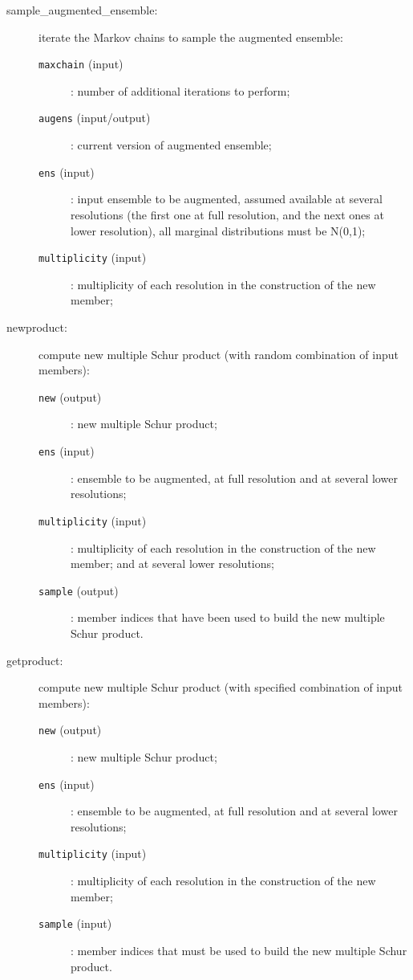 \documentclass[11pt]{article}
\begin{document}
\begin{description}
\item[sample\_augmented\_ensemble:] iterate the Markov chains to sample the augmented ensemble:
  \begin{description}
  \item[{\tt maxchain} (input)]: number of additional iterations to perform;
  \item[{\tt augens} (input/output)]: current version of augmented ensemble;
  \item[{\tt ens} (input)]: input ensemble to be augmented,
                            assumed available at several resolutions
                            (the first one at full resolution, and the next ones at lower resolution),
                            all marginal distributions must be N(0,1);
  \item[{\tt multiplicity} (input)]:  multiplicity of each resolution
                            in the construction of the new member;
  \end{description}
\item[newproduct:] compute new multiple Schur product (with random combination of input members):
  \begin{description}
  \item[{\tt new} (output)]: new multiple Schur product;
  \item[{\tt ens} (input)]: ensemble to be augmented, at full resolution
                            and at several lower resolutions;
  \item[{\tt multiplicity} (input)]: multiplicity of each resolution
                            in the construction of the new member;
                            and at several lower resolutions;
  \item[{\tt sample} (output)]: member indices that have been used to build the new multiple Schur product.
  \end{description}
\item[getproduct:] compute new multiple Schur product (with specified combination of input members):
  \begin{description}
  \item[{\tt new} (output)]: new multiple Schur product;
  \item[{\tt ens} (input)]: ensemble to be augmented, at full resolution
                            and at several lower resolutions;
  \item[{\tt multiplicity} (input)]: multiplicity of each resolution
                            in the construction of the new member;
  \item[{\tt sample} (input)]: member indices that must be used to build the new multiple Schur product.
  \end{description}
\end{description}
\end{document}
